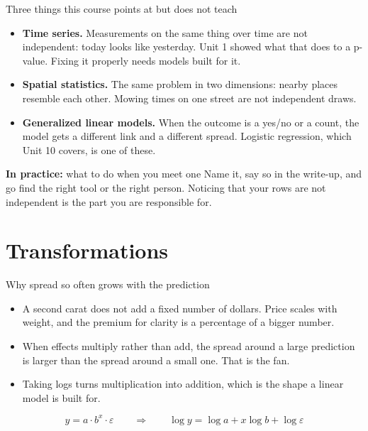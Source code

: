 \documentclass[aspectratio=169]{beamer}
\newenvironment{practice}[1]{\begin{exampleblock}{\textbf{In practice:} #1}}{\end{exampleblock}}
\begin{document}
\begin{frame}{Three things this course points at but does not teach}
\begin{itemize}
  \item \textbf{Time series.} Measurements on the same thing over time are not independent:
        today looks like yesterday. Unit 1 showed what that does to a p-value. Fixing it properly
        needs models built for it.
  \item \textbf{Spatial statistics.} The same problem in two dimensions: nearby places resemble
        each other. Mowing times on one street are not independent draws.
  \item \textbf{Generalized linear models.} When the outcome is a yes/no or a count, the model
        gets a different link and a different spread. Logistic regression, which Unit 10 covers,
        is one of these.
\end{itemize}
\begin{practice}{what to do when you meet one}
Name it, say so in the write-up, and go find the right tool or the right person. Noticing that
your rows are not independent is the part you are responsible for.
\end{practice}
\end{frame}

\section{Transformations}
\begin{frame}{Why spread so often grows with the prediction}
\begin{itemize}
  \item A second carat does not add a fixed number of dollars. Price scales with weight, and the
        premium for clarity is a percentage of a bigger number.
  \item When effects multiply rather than add, the spread around a large prediction is larger
        than the spread around a small one. That is the fan.
  \item Taking logs turns multiplication into addition, which is the shape a linear model is
        built for.
\end{itemize}
\[
   y = a \cdot b^{x} \cdot \varepsilon
   \qquad\Longrightarrow\qquad
   \log y = \log a + x\log b + \log\varepsilon
\]
\end{frame}
\end{document}
